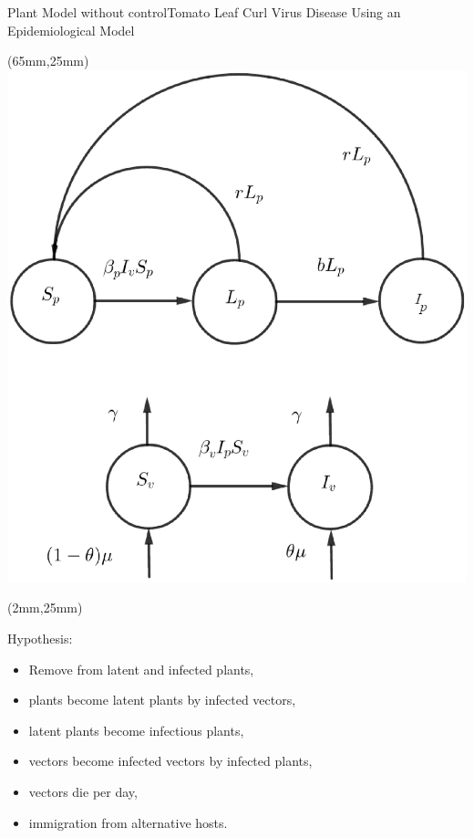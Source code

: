 \begin{frame}{Plant Model without control}{Tomato Leaf Curl Virus Disease Using an Epidemiological Model}
		\begin{textblock*}{60mm}(65mm,25mm)
			\includegraphics[width=\linewidth]{Feathergraphics/plant_diagram.eps}
		\end{textblock*}
		\begin{textblock*}{60mm}(2mm,25mm)
			\begin{graybox}{Hypothesis:}
				
				\begin{itemize}
					\item Remove from latent and infected plants,
					\item plants become latent plants by infected vectors,
					\item latent plants become infectious plants,
					\item vectors become infected vectors by infected plants,
					\item vectors die per day,
					\item immigration from alternative hosts.
				\end{itemize}
			\end{graybox}	
		\end{textblock*}
\end{frame}
